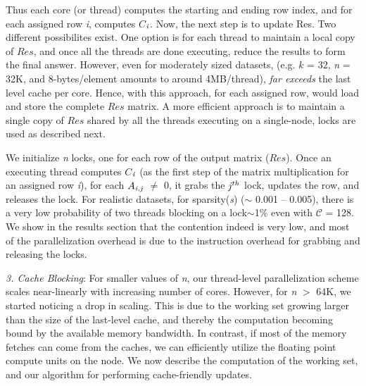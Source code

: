      Thus each core (or thread) computes the starting and ending row
     index, and for each assigned row {\it{i}}, computes
     $C$$_{{\it{i}}}$. Now, the next step is to update Res.
     Two different possibilites exist. One option is for each thread
     to maintain a local copy of $Res$, and once all the threads are
     done executing, reduce the results to form the final answer.
     However, even for moderately sized datasets, (e.g. $k$ = 32,
     {\it{n}} = 32K, and 8-bytes/element amounts to around
     4MB/thread), 
     {\it{far exceeds}} the last level cache per core.
     Hence, with this approach, for each assigned row,  would load and store the
     complete $Res$ matrix. A more efficient approach is to maintain a
     single copy of $Res$ shared by all the threads executing on a
     single-node, locks are used as described next. 

     We initialize {\it{n}} locks, one for each row of the output
     matrix ($Res$).
     Once an executing thread computes $C$$_{{\it{i}}}$ (as the first
     step of the matrix multiplication 
     for an assigned row {\it{i}}), 
     for each  $A_{{\it{i}},{\it{j}}}$ $\neq$ 0, it grabs the
     ${\it{j}}^{th}$ lock, updates the row, and releases the lock. 
     For realistic datasets, for sparsity({\it{s}})
     ($\sim$
     0.001 -- 0.005), there is a very low probability of two threads
     blocking on a lock$\sim$1\% even with ${\mathcal{C}}$ =
     128. We show in the results section that the contention indeed is
     very low, and most of the parallelization overhead is due to the
     instruction overhead for grabbing and releasing the locks.


     \vspace*{0.1in}
     {\it{3. Cache Blocking}}: For smaller values of {\it{n}}, our
     thread-level parallelization scheme scales near-linearly with
     increasing number of cores. However, for {\it{n}} $>$ 64K, we
     started noticing a drop in scaling. This is due to the working
     set growing larger than the size of the last-level cache, and
     thereby the computation becoming bound by the available memory
     bandwidth. In contrast, if most of the memory fetches can come
     from the caches, we can efficiently  utilize the floating
     point compute units on the node. We now
     describe the computation of the working set, and our algorithm
     for performing cache-friendly updates.

